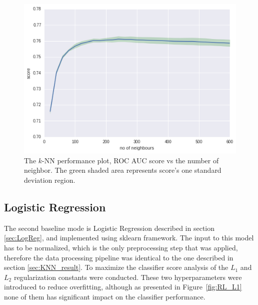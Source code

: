 \begin{figure}[!h]
\centering
\hspace*{-1cm}\includegraphics{figures/knn.png}
\caption{The $k$-NN performance plot, ROC AUC score vs the number of neighbor. The green shaded area represents score's one standard deviation region.}
\label{fig:kNN score}
\end{figure}

\subsection{Logistic Regression}

The second baseline mode is Logistic Regression described in section \ref{sec:LogReg}, and implemented using sklearn framework.
The input to this model has to be normalized, which is the only preprocessing step that was applied, therefore the data processing pipeline was identical to the one described in section \ref{sec:KNN_result}. 
To maximize the classifier score analysis of the $L_1$ and $L_2$ regularization constants were conducted. These two hyperparameters were introduced to reduce overfitting, although as presented in Figure~\ref{fig:RL_L1} none of them has significant impact on the classifier performance.



